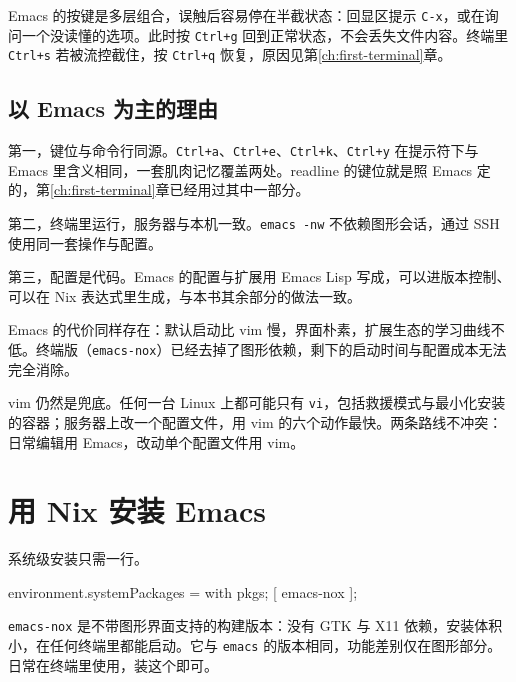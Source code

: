 \begin{notebox}
Emacs 的按键是多层组合，误触后容易停在半截状态：回显区提示 \texttt{C-x}，或在询问一个没读懂的选项。此时按 \texttt{Ctrl+g} 回到正常状态，不会丢失文件内容。终端里 \texttt{Ctrl+s} 若被流控截住，按 \texttt{Ctrl+q} 恢复，原因见第\ref{ch:first-terminal}章。
\end{notebox}

\subsection{以 Emacs 为主的理由}

第一，键位与命令行同源。\texttt{Ctrl+a}、\texttt{Ctrl+e}、\texttt{Ctrl+k}、\texttt{Ctrl+y} 在提示符下与 Emacs 里含义相同，一套肌肉记忆覆盖两处。readline 的键位就是照 Emacs 定的，第\ref{ch:first-terminal}章已经用过其中一部分。

第二，终端里运行，服务器与本机一致。\texttt{emacs -nw} 不依赖图形会话，通过 SSH 使用同一套操作与配置。

第三，配置是代码。Emacs 的配置与扩展用 Emacs Lisp 写成，可以进版本控制、可以在 Nix 表达式里生成，与本书其余部分的做法一致。

Emacs 的代价同样存在：默认启动比 vim 慢，界面朴素，扩展生态的学习曲线不低。终端版（\texttt{emacs-nox}）已经去掉了图形依赖，剩下的启动时间与配置成本无法完全消除。

vim 仍然是兜底。任何一台 Linux 上都可能只有 \texttt{vi}，包括救援模式与最小化安装的容器；服务器上改一个配置文件，用 vim 的六个动作最快。两条路线不冲突：日常编辑用 Emacs，改动单个配置文件用 vim。

\section{用 Nix 安装 Emacs}

系统级安装只需一行。

\begin{nixcode}
environment.systemPackages = with pkgs; [ emacs-nox ];
\end{nixcode}

\texttt{emacs-nox} 是不带图形界面支持的构建版本：没有 GTK 与 X11 依赖，安装体积小，在任何终端里都能启动。它与 \texttt{emacs} 的版本相同，功能差别仅在图形部分。日常在终端里使用，装这个即可。



